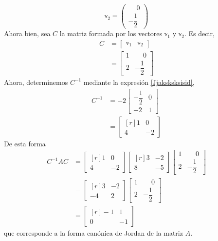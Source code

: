 \begin{example}
    $$\mathbb{v}_2 = \begin{pmatrix}
        \phantom{-} 0 \\[1.5mm]
        -\dfrac{1}{2}
    \end{pmatrix}$$
    Ahora bien, sea $C$ la matriz formada por los vectores $\mathbb{v}_1$ y $\mathbb{v}_2$. Es decir,
    \begin{align*}
        C & = \begin{bmatrix}
            \mathbb{v}_1 & \mathbb{v}_2
        \end{bmatrix} \\
        & = \begin{bmatrix}
            1 & \phantom{-} 0 \\[1.5mm]
            2 & - \dfrac{1}{2}
        \end{bmatrix}
    \end{align*}
    Ahora, determinemos $C^{-1}$ mediante la expresión \ref{Jjaksksksisid},
    \begin{align*}
        C^{-1} & = -2 \begin{bmatrix}
            - \dfrac{1}{2} & 0 \\[1.5mm]
            - 2 & 1
        \end{bmatrix} \\
        & = \begin{bmatrix*}[r]
            1 & 0 \\
            4 & -2
        \end{bmatrix*}
    \end{align*}
    De esta forma
    \begin{align*}
        C^{-1} A C & = \begin{bmatrix*}[r]
            1 & 0 \\
            4 & -2
        \end{bmatrix*} \begin{bmatrix*}[r]
            3 & -2 \\
            8 & -5
        \end{bmatrix*} \begin{bmatrix}
            1 & \phantom{-} 0 \\[1.5mm]
            2 & -\dfrac{1}{2}
        \end{bmatrix} \\
        & = \begin{bmatrix*}[r]
            3 & -2 \\
            -4 & 2
        \end{bmatrix*} \begin{bmatrix}
            1 & \phantom{-} 0 \\[1.5mm]
            2 & -\dfrac{1}{2}
        \end{bmatrix} \\
        & = \begin{bmatrix*}[r]
            -1 & 1 \\
            0 & -1
        \end{bmatrix*}
    \end{align*}
    que corresponde a la forma canónica de Jordan de la matriz $A$.
\end{example}


